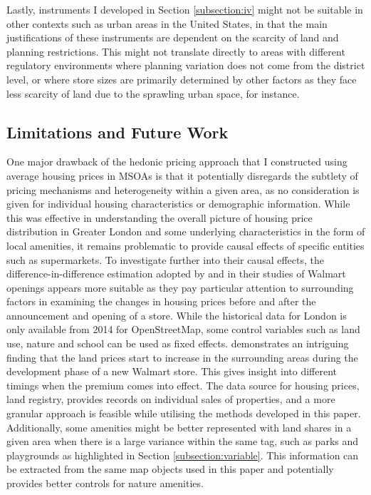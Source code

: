 \documentclass{article}
\begin{document}
Lastly, instruments I developed in Section \ref{subsection:iv} might not be suitable in other contexts such as urban areas in the United States, in that the main justifications of these instruments are dependent on the scarcity of land and planning restrictions. This might not translate directly to areas with different regulatory environments where planning variation does not come from the district level, or where store sizes are primarily determined by other factors as they face less scarcity of land due to the sprawling urban space, for instance.

\subsection{Limitations and Future Work}  \label{subsection:limitations}
One major drawback of the hedonic pricing approach that I constructed using average housing prices in MSOAs is that it potentially disregards the subtlety of pricing mechanisms and heterogeneity within a given area, as no consideration is given for individual housing characteristics or demographic information. While this was effective in understanding the overall picture of housing price distribution in Greater London and some underlying characteristics in the form of local amenities, it remains problematic to provide causal effects of specific entities such as supermarkets. To investigate further into their causal effects, the difference-in-difference estimation adopted by \citet{Pope2015WhenAlways} and \citet{Slade2016Walmart} in their studies of Walmart openings appears more suitable as they pay particular attention to surrounding factors in examining the changes in housing prices before and after the announcement and opening of a store. While the historical data for London is only available from 2014 for OpenStreetMap, some control variables such as land use, nature and school can be used as fixed effects. \citet{Slade2016Walmart} demonstrates an intriguing finding that the land prices start to increase in the surrounding areas during the development phase of a new Walmart store. This gives insight into different timings when the premium comes into effect. The data source for housing prices, land registry, provides records on individual sales of properties, and a more granular approach is feasible while utilising the methods developed in this paper. Additionally, some amenities might be better represented with land shares in a given area when there is a large variance within the same tag, such as parks and playgrounds as highlighted in Section \ref{subsection:variable}. This information can be extracted from the same map objects used in this paper and potentially provides better controls for nature amenities. 
\end{document}

